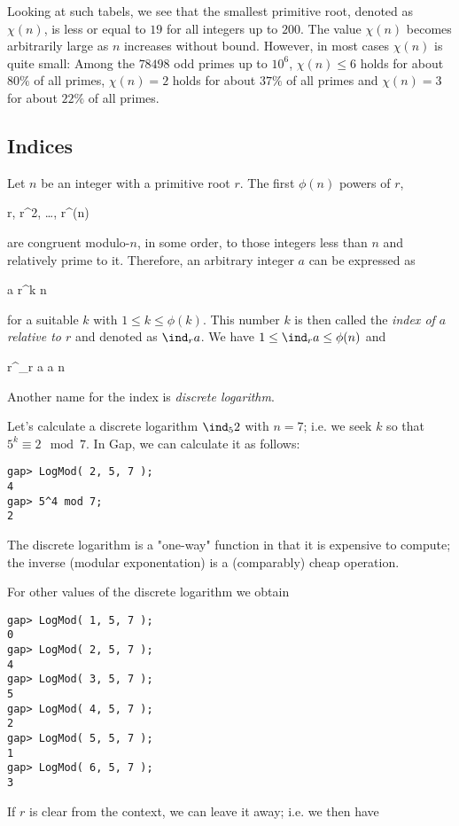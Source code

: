 Looking at such tabels, we see that the smallest primitive root, denoted as $\chi(n)$, is less or equal to $19$ for all integers up to $200$. The value $\chi(n)$ becomes arbitrarily large as $n$ increases without bound. However, in most cases $\chi(n)$ is quite small: Among the $78498$ odd primes up to $10^6$, $\chi(n) \leq 6$ holds for about $80\%$ of all primes, $\chi(n) = 2$ holds for about $37\%$ of all primes and $\chi(n) = 3$ for about $22\%$ of all primes.


\subsection{Indices}

Let $n$ be an integer with a primitive root $r$. The first $\phi(n)$ powers of $r$,

\bee
r, r^2, \ldots, r^{\phi(n)}
\eee

are congruent modulo-$n$, in some order, to those integers less than $n$ and relatively prime to it. Therefore, an arbitrary integer $a$ can be expressed as

\bee
a \equiv r^k \mod n
\eee

for a suitable $k$ with $1 \leq k \leq \phi(k)$. This number $k$ is then called the \emph{index of $a$ relative to $r$} and denoted as $\ind_r a$. We have $1 \leq \ind_r a \leq \phi(n)$ and

\bee
r^{\ind_r a} \equiv a \mod n
\eee

Another name for the index is \emph{discrete logarithm}.

Let's calculate a discrete logarithm $\ind_5 2$ with $n=7$; i.e. we seek $k$ so that $5^k \equiv 2 \mod 7$. In Gap, we can calculate it as follows:

\begin{verbatim}
gap> LogMod( 2, 5, 7 );
4
gap> 5^4 mod 7;
2
\end{verbatim}

The discrete logarithm is a "one-way" function in that it is expensive to compute; the inverse (modular exponentation) is a (comparably) cheap operation.

For other values of the discrete logarithm we obtain

\begin{verbatim}
gap> LogMod( 1, 5, 7 );
0
gap> LogMod( 2, 5, 7 );
4
gap> LogMod( 3, 5, 7 );
5
gap> LogMod( 4, 5, 7 );
2
gap> LogMod( 5, 5, 7 );
1
gap> LogMod( 6, 5, 7 );
3
\end{verbatim}

If $r$ is clear from the context, we can leave it away; i.e. we then have

